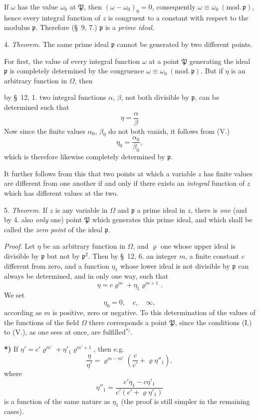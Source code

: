 \documentclass{article}
\begin{document}
If $\omega$ has the value $\omega_{0}$ at $\mathfrak{P}$, then $(\omega - \omega_{0})_{0} = 0$, consequently $\omega \equiv \omega_{0} \ (\text{mod.}\,\mathfrak{p})$, hence every integral function of $z$ is congruent to a constant with respect to the modulus $\mathfrak{p}$. Therefore (§~9, 7.) $\mathfrak{p}$ is a \emph{prime ideal}.

4. \emph{Theorem.} The same prime ideal $\mathfrak{p}$ cannot be generated by two different points.

For first, the value of every integral function $\omega$ at a point $\mathfrak{P}$ generating the ideal $\mathfrak{p}$ is completely determined by the congruence $\omega \equiv \omega_{0} \ (\text{mod.}\,\mathfrak{p})$. But if $\eta$ is an arbitrary function in $\Omega$, then

by §~12, 1. two integral functions $\alpha$, $\beta$, not both divisible by $\mathfrak{p}$, can be determined such that
\[ \eta = \frac{\alpha}{\beta} \]
Now since the finite values $\alpha_{0}$, $\beta_{0}$ do not both vanish, it follows from (V.)
\[ \eta_{0} = \frac{\alpha_{0}}{\beta_{0}}, \]
which is therefore likewise completely determined by $\mathfrak{p}$.

It further follows from this that two points at which a variable $z$ has finite values are different from one another if and only if there exists an \emph{integral} function of $z$ which has different values at the two.

5. \emph{Theorem.} If $z$ is any variable in $\Omega$ and $\mathfrak{p}$ a prime ideal in $z$, there is \emph{one} (and by 4. also \emph{only} one) point $\mathfrak{P}$ which generates this prime ideal, and which shall be called the \emph{zero point} of the ideal $\mathfrak{p}$.

\emph{Proof.} Let $\eta$ be an arbitrary function in $\Omega$, and $\varrho$ one whose upper ideal is divisible by $\mathfrak{p}$ but not by $\mathfrak{p}^{2}$. Then by §~12, 6. an integer $m$, a finite constant $c$ different from zero, and a function $\eta_{1}$ whose lower ideal is not divisible by $\mathfrak{p}$ can always be determined, and in only one way, such that
\[ \eta = c\varrho^{m} + \eta_{1}\varrho^{m+1}. \]
We set
\[ \eta_{0} = 0, \quad c, \quad \infty, \]
according as $m$ is positive, zero or negative. To this determination of the values of the functions of the field $\Omega$ there corresponds a point $\mathfrak{P}$, since the conditions (I.) to (V.), as one sees at once, are fulfilled${}^{*)}$.

\textbf{*)} If $\eta' = c'\varrho^{m'} + \eta'_{1}\varrho^{m'+1}$, then e.g.\
\[ \frac{\eta}{\eta'} = \varrho^{m-m'}\left(\frac{c}{c'} + \varrho\eta''_{1}\right), \]
where
\[ \eta''_{1} = \frac{c'\eta_{1} - c\eta'_{1}}{c'(c' + \varrho\eta'_{1})} \]
is a function of the same nature as $\eta_{1}$ (the proof is still simpler in the remaining cases).
\end{document}
